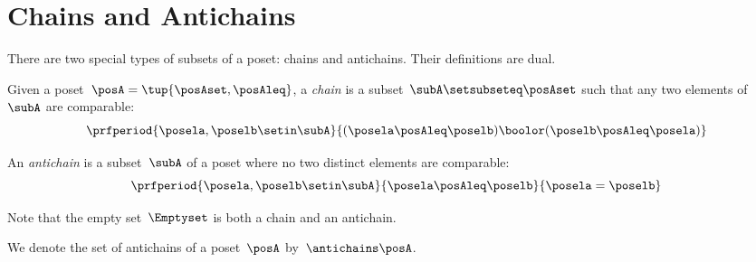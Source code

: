 
\section{Chains and Antichains}
\label{sec:chains-antichains}

There are two special types of subsets of a poset: chains and antichains.
Their definitions are dual.

\begin{definition}
    \label{def:chain}
    Given a poset~$\posA = \tup{\posAset, \posAleq}$, a \emph{chain} is a subset~$\subA \setsubseteq \posAset$ such that any two elements of~$\subA$ are comparable:
    \begin{equation*}
        \prfperiod{
            \posela,\poselb \setin \subA
        }{
            (\posela \posAleq  \poselb) \boolor (\poselb \posAleq  \posela)
        }
    \end{equation*}
\end{definition}

\begin{definition}
    \label{def:antichain}
    An \emph{antichain} is a subset~$\subA$ of a poset where no two distinct elements are comparable:
    \begin{equation*}
        \prfperiod{
            \posela,\poselb \setin \subA
        }{
            \posela \posAleq \poselb
        }{
            \posela = \poselb
        }
    \end{equation*}
\end{definition}
\begin{remark}
    Note that the empty set~$\Emptyset$ is both a chain and an antichain.
\end{remark}

We denote the set of antichains of a poset~$\posA$ by~$\antichains\posA$.

